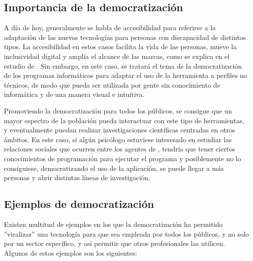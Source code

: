 \subsection{Importancia de la democratización}

A día de hoy, generalmente se habla de accesibilidad para referirse a la adaptación de las nuevas tecnologías para personas con discapacidad de distintos tipos. La accesibilidad en estos casos facilita la vida de las personas, mueve la inclusividad digital y amplía el alcance de las marcas, como se explica en el estudio de \citep{kavcic2005software}. Sin embargo, en este caso, se tratará el tema de la democratización de los programas informáticos para adaptar el uso de la herramienta a perfiles no técnicos, de modo que pueda ser utilizada por gente sin conocimiento de informática y de una manera visual e intuitiva.

Promoviendo la democratización para todos los públicos, se consigue que un mayor espectro de la población pueda interactuar con este tipo de herramientas, y eventualmente puedan realizar investigaciones científicas centradas en otros ámbitos. En este caso, si algún psicólogo estuviese interesado en estudiar las relaciones sociales que ocurren entre los agentes de \ga, tendría que tener ciertos conocimientos de programación para ejecutar el programa y posiblemente no lo consiguiese, democratizando el uso de la aplicación, se puede llegar a más personas y abrir distintas líneas de investigación.

\subsection{Ejemplos de democratización}

Existen multitud de ejemplos en los que la democratización ha permitido ''viralizar'' una tecnología para que sea empleada por todos los públicos, y no solo por un sector específico, y así permitir que otros profesionales las utilicen. Algunos de estos ejemplos son los siguientes: 

